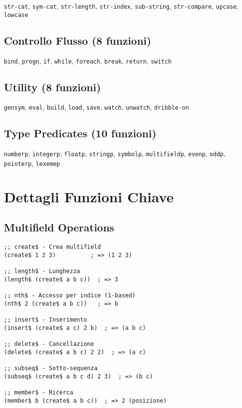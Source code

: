 \texttt{str-cat}, \texttt{sym-cat}, \texttt{str-length}, \texttt{str-index}, \texttt{sub-string}, \texttt{str-compare}, \texttt{upcase}, \texttt{lowcase}

\subsection{Controllo Flusso (8 funzioni)}

\texttt{bind}, \texttt{progn}, \texttt{if}, \texttt{while}, \texttt{foreach}, \texttt{break}, \texttt{return}, \texttt{switch}

\subsection{Utility (8 funzioni)}

\texttt{gensym}, \texttt{eval}, \texttt{build}, \texttt{load}, \texttt{save}, \texttt{watch}, \texttt{unwatch}, \texttt{dribble-on}

\subsection{Type Predicates (10 funzioni)}

\texttt{numberp}, \texttt{integerp}, \texttt{floatp}, \texttt{stringp}, \texttt{symbolp}, \texttt{multifieldp}, \texttt{evenp}, \texttt{oddp}, \texttt{pointerp}, \texttt{lexemep}

\section{Dettagli Funzioni Chiave}

\subsection{Multifield Operations}

\begin{lstlisting}[language=CLIPS]
;; create$ - Crea multifield
(create$ 1 2 3)          ; => (1 2 3)

;; length$ - Lunghezza
(length$ (create$ a b c))  ; => 3

;; nth$ - Accesso per indice (1-based)
(nth$ 2 (create$ a b c))   ; => b

;; insert$ - Inserimento
(insert$ (create$ a c) 2 b)  ; => (a b c)

;; delete$ - Cancellazione
(delete$ (create$ a b c) 2 2)  ; => (a c)

;; subseq$ - Sotto-sequenza
(subseq$ (create$ a b c d) 2 3)  ; => (b c)

;; member$ - Ricerca
(member$ b (create$ a b c))  ; => 2 (posizione)
\end{lstlisting}

